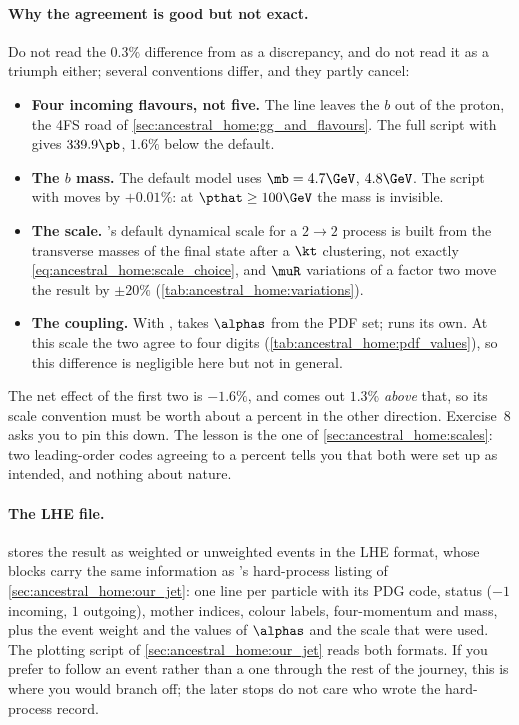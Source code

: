 \paragraph{Why the agreement is good but not exact.} Do not read the
$0.3\%$ difference from \PYTHIA as a discrepancy, and do not read it as a
triumph either; several conventions differ, and they partly cancel:
\begin{itemize}[nosep]
  \item \textbf{Four incoming flavours, not five.} The  line
    leaves the $b$ out of the proton, the 4FS road of
    \cref{sec:ancestral_home:gg_and_flavours}. The full script with
     gives $339.9\pb$, $1.6\%$ below the default.
  \item \textbf{The $b$ mass.} The default  model uses
    $\mb=4.7\GeV$, \PYTHIA $4.8\GeV$. The script with  moves
    by $+0.01\%$: at $\pthat\ge100\GeV$ the mass is invisible.
  \item \textbf{The scale.} \MG's default dynamical scale for a $2\to2$
    process is built from the transverse masses of the final state after a
    $\kt$ clustering, not exactly \cref{eq:ancestral_home:scale_choice},
    and $\muR$ variations of a factor two move the result by $\pm20\%$
    (\cref{tab:ancestral_home:variations}).
  \item \textbf{The coupling.} With , \MG takes
    $\alphas$ from the PDF set; \PYTHIA runs its own. At this scale the two
    agree to four digits (\cref{tab:ancestral_home:pdf_values}), so this
    difference is negligible here but not in general.
\end{itemize}
The net effect of the first two is $-1.6\%$, and \MG comes out $1.3\%$
\emph{above} that, so its scale convention must be worth about a percent in
the other direction. Exercise~8 asks you to pin this down. The lesson is the
one of \cref{sec:ancestral_home:scales}: two leading-order codes agreeing to
a percent tells you that both were set up as intended, and nothing about
nature.

\paragraph{The LHE file.} \MG stores the result as weighted or unweighted
events in the LHE format, whose  blocks carry the same
information as \PYTHIA's hard-process listing of
\cref{sec:ancestral_home:our_jet}: one line
per particle with its PDG code, status ($-1$ incoming, $1$ outgoing), mother
indices, colour labels, four-momentum and mass, plus the event weight and the
values of $\alphas$ and the scale that were used. The plotting script of
\cref{sec:ancestral_home:our_jet} reads both formats. If you prefer to
follow an \MG event rather than a \PYTHIA one through the rest of the
journey, this is where you would branch off; the later stops do not care
who wrote the hard-process record.

